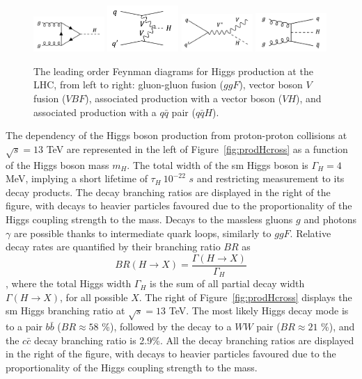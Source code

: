 \begin{figure}[h!]
    \center
    \includegraphics[width=0.24\textwidth]{Images/Theory/ggH.png}
    \includegraphics[width=0.24\textwidth]{Images/Theory/vvH.png}
    \includegraphics[width=0.24\textwidth]{Images/Theory/vh.png}
    \includegraphics[width=0.24\textwidth]{Images/Theory/qqH.png}
    \caption{The leading order Feynman diagrams for Higgs production at the LHC, from left to right: gluon-gluon fusion ($ggF$), vector boson $V$ fusion ($VBF$), associated production with a vector boson ($VH$), and associated production with a $q\bar{q}$ pair ($q\bar{q}H$).}
    \label{fig:prodH}
\end{figure}

The dependency of the Higgs boson production from proton-proton collisions at $\sqrt{s} = 13$ TeV are represented in the left of Figure~\ref{fig:prodHcross} as a function of the Higgs boson mass $m_H$. The total width of the \gls{sm} Higgs boson is $\Gamma_H = 4$ MeV, implying a short lifetime of $\tau_H ~ 10^{-22}$ $s$ and restricting measurement to its decay products. The decay branching ratios are displayed in the right of the figure, with decays to heavier particles favoured due to the proportionality of the Higgs coupling strength to the mass. Decays to the massless gluons $g$ and photons $\gamma$ are possible thanks to intermediate quark loops, similarly to $ggF$. Relative decay rates are quantified by their branching ratio $BR$ as
\begin{equation}
    BR(H \rightarrow X) = \frac{\Gamma(H\rightarrow X)}{\Gamma_H}
\end{equation},
where the total Higgs width $\Gamma_H$ is the sum of all partial decay width $\Gamma(H\rightarrow X)$, for all possible $X$. The right of Figure~\ref{fig:prodHcross} displays the \gls{sm} Higgs branching ratio at $\sqrt{s} = 13$ TeV. The most likely Higgs decay mode is to a pair $b\bar{b}$ ($BR \approx 58$ \%), followed by the decay to a $WW$ pair ($BR \approx 21$ \%), and the $c\bar{c}$ decay branching ratio is 2.9\%. All the decay branching ratios are displayed in the right of the figure, with decays to heavier particles favoured due to the proportionality of the Higgs coupling strength to the mass. \\

